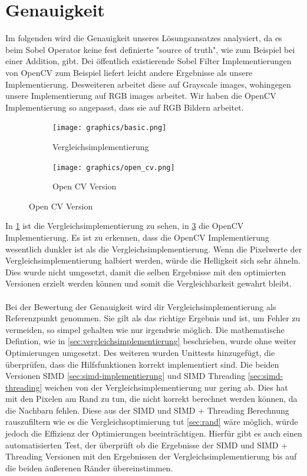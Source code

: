 \documentclass[course=erap]{aspdoc}
\begin{document}
\section{Genauigkeit}
Im folgenden wird die Genauigkeit unseres Lösungsansatzes analysiert, da es beim Sobel Operator keine fest definierte "source of truth", wie zum Beispiel bei einer Addition, gibt.
Dei öffentlich existierende Sobel Filter Implementierungen von OpenCV zum Beispiel liefert leicht andere Ergebnisse als unsere Implementierung.
Desweiteren arbeitet diese auf Grayscale images, wohingegen unsere Implementierung auf RGB images arbeitet. Wir haben die OpenCV Implementierung so angepasst, dass sie auf RGB Bildern arbeitet.
\begin{figure}[H]
    \begin{subfigure}{.5\columnwidth}
        \centering
        \texttt{[image: graphics/basic.png]}
        \caption{Vergleichsimplementierung}
        \label{fig:basic}
    \end{subfigure}
    \begin{subfigure}{.5\columnwidth}
        \centering
        \texttt{[image: graphics/open\_cv.png]}
        \caption{Open CV Version}
        \label{fig:opencv}
    \end{subfigure}
\end{figure}
In {\ref{fig:basic}} ist die Vergleichsimplementierung zu sehen, in {\ref{fig:opencv}} die OpenCV Implementierung.
Es ist zu erkennen, dass die OpenCV Implementierung wesentlich dunkler ist als die Vergleichsimplementierung.
Wenn die Pixelwerte der Vergleichsimplementierung halbiert werden, würde die Helligkeit sich sehr ähneln.
Dies wurde nicht umgesetzt, damit die selben Ergebnisse mit den optimierten Versionen erzielt werden können und somit die Vergleichbarkeit gewahrt bleibt. 
\\\\
Bei der Bewertung der Genauigkeit wird dir Vergleichsimplementierung als Referenzpunkt genommen. Sie gilt als das richtige Ergebnis und ist, um Fehler zu vermeiden, so simpel gehalten wie nur irgendwie möglich.
Die mathematische Defintion, wie in \ref{sec:vergleichsimplementierung} beschrieben, wurde ohne weiter Optimierungen umgesetzt.
Des weiteren wurden Unittests hinzugefügt, die überprüfen, dass die Hilfsfunktionen korrekt implementiert sind.
Die beiden Versionen SIMD \ref{sec:simd-implementierung} und SIMD Threading \ref{sec:simd-threading} weichen von der Vergleichsimplementierung nur gering ab.
Dies hat mit den Pixelen am Rand zu tun, die nicht korrekt berechnet werden können, da die Nachbarn fehlen.
Diese aus der SIMD und SIMD + Threading Berechnung rauszufiltern wie es die Vergleichsoptimierung tut \ref{sec:rand} wäre möglich, würde jedoch die Effizienz der Optimierungen beeinträchtigen.
Hierfür gibt es auch einen automatisierten Test, der überprüft ob die Ergebnisse der SIMD und SIMD + Threading Versionen mit den
Ergebnissen der Vergleichsimplementierung bis auf die beiden äußerenen Ränder übereinstimmen.
\end{document}
